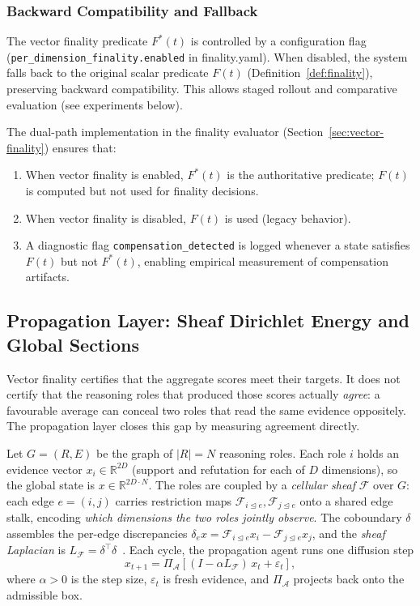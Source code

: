 \documentclass[11pt]{article}
\begin{document}
\subsubsection{Backward Compatibility and Fallback}

The vector finality predicate $F^*(t)$ is controlled by a configuration flag
(\texttt{per\_dimension\_finality.enabled} in finality.yaml). When disabled, the system falls back
to the original scalar predicate $F(t)$ (Definition~\ref{def:finality}), preserving backward
compatibility. This allows staged rollout and comparative evaluation (see experiments below).

The dual-path implementation in the finality evaluator (Section~\ref{sec:vector-finality}) ensures that:
\begin{enumerate}
  \item When vector finality is enabled, $F^*(t)$ is the authoritative predicate; $F(t)$ is computed
  but not used for finality decisions.
  \item When vector finality is disabled, $F(t)$ is used (legacy behavior).
  \item A diagnostic flag \texttt{compensation\_detected} is logged whenever a state satisfies $F(t)$
  but not $F^*(t)$, enabling empirical measurement of compensation artifacts.
\end{enumerate}

\subsection{Propagation Layer: Sheaf Dirichlet Energy and Global Sections}
\label{sec:propagation-layer}

Vector finality certifies that the aggregate scores meet their targets. It does not certify that the reasoning roles that produced those scores actually \emph{agree}: a favourable average can conceal two roles that read the same evidence oppositely. The propagation layer closes this gap by measuring agreement directly.

Let $G = (R, E)$ be the graph of $|R| = N$ reasoning roles. Each role $i$ holds an evidence vector $x_i \in \mathbb{R}^{2D}$ (support and refutation for each of $D$ dimensions), so the global state is $x \in \mathbb{R}^{2D \cdot N}$. The roles are coupled by a \emph{cellular sheaf} $\mathcal{F}$ over $G$: each edge $e = (i,j)$ carries restriction maps $\mathcal{F}_{i\trianglelefteq e}, \mathcal{F}_{j\trianglelefteq e}$ onto a shared edge stalk, encoding \emph{which dimensions the two roles jointly observe}. The coboundary $\delta$ assembles the per-edge discrepancies $\delta_e x = \mathcal{F}_{i\trianglelefteq e} x_i - \mathcal{F}_{j\trianglelefteq e} x_j$, and the \emph{sheaf Laplacian} is $L_{\mathcal{F}} = \delta^\top \delta$~\cite{ghrist2022}. Each cycle, the propagation agent runs one diffusion step
\[
x_{t+1} = \Pi_{\mathcal{A}}\!\left[(I - \alpha L_{\mathcal{F}})\, x_t + \varepsilon_t\right],
\]
where $\alpha > 0$ is the step size, $\varepsilon_t$ is fresh evidence, and $\Pi_{\mathcal{A}}$ projects back onto the admissible box.
\end{document}
